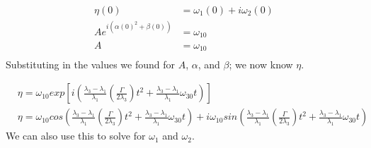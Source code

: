 \documentclass{article}
\begin{document}
\begin{align*}
    \eta(0) &= \omega_1(0) + i\omega_2(0) \\
    Ae^{i(\alpha (0)^2 + \beta (0))} &= \omega_{10} \\
    A &= \omega_{10} \\
\end{align*}
Substituting in the values we found for $A$, $\alpha$, and $\beta$; we now know $\eta$. 

\begin{align*}
    &\eta = \omega_{10}  exp\left[ i\left( \frac{\lambda_3-\lambda_1}{\lambda_1}\left( \frac{\Gamma }{2\lambda_3}\right)t^2 + \frac{\lambda_3-\lambda_1}{\lambda_1}\omega_{30} t\right) \right] \\
    &\eta = \omega_{10} cos\left( \frac{\lambda_3-\lambda_1}{\lambda_1}\left( \frac{\Gamma }{2\lambda_3}\right)t^2 + \frac{\lambda_3-\lambda_1}{\lambda_1}\omega_{30} t \right) + i \omega_{10} sin\left( \frac{\lambda_3-\lambda_1}{\lambda_1}\left( \frac{\Gamma }{2\lambda_3}\right)t^2 + \frac{\lambda_3-\lambda_1}{\lambda_1}\omega_{30} t \right)
\end{align*}
We can also use this to solve for $\omega_1$ and $\omega_2$.
\end{document}
